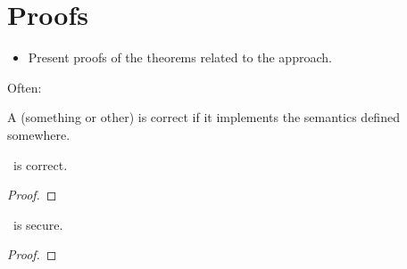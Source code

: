 \section{Proofs}\label{sec:proof}

\begin{itemize}
  \item Present proofs of the theorems related to the approach.
\end{itemize}

Often:

\begin{definition}
  A (something or other) is correct if it implements the semantics defined somewhere.
\end{definition}

\begin{theorem}
  \ourapproach~is correct.
\end{theorem}
\begin{proof}
\end{proof}

\begin{theorem}
  \ourapproach~is secure.
\end{theorem}
\begin{proof}
\end{proof}
